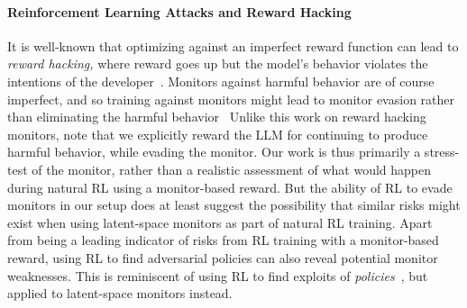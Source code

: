 \paragraph{Reinforcement Learning Attacks and Reward Hacking}
It is well-known that optimizing against an imperfect reward function can lead to \emph{reward hacking,} where reward goes up but the model's behavior violates the intentions of the developer~\citep{skalse2025defining,pan2024feedbackloops,gao2022scalinglaws}.
Monitors against harmful behavior are of course imperfect, and so training against monitors might lead to monitor evasion rather than eliminating the harmful behavior~\citep{baker2025monitoring}
Unlike this work on reward hacking monitors, note that we explicitly reward the LLM for continuing to produce harmful behavior, while evading the monitor. Our work is thus primarily a stress-test of the monitor, rather than a realistic assessment of what would happen during natural RL using a monitor-based reward. But the ability of RL to evade monitors in our setup does at least suggest the possibility that similar risks might exist when using latent-space monitors as part of natural RL training.
Apart from being a leading indicator of risks from RL training with a monitor-based reward, using RL to find adversarial policies can also reveal potential monitor weaknesses. This is reminiscent of using RL to find exploits of \emph{policies}~\citep{gleave2021adversarial}, but applied to latent-space monitors instead.




